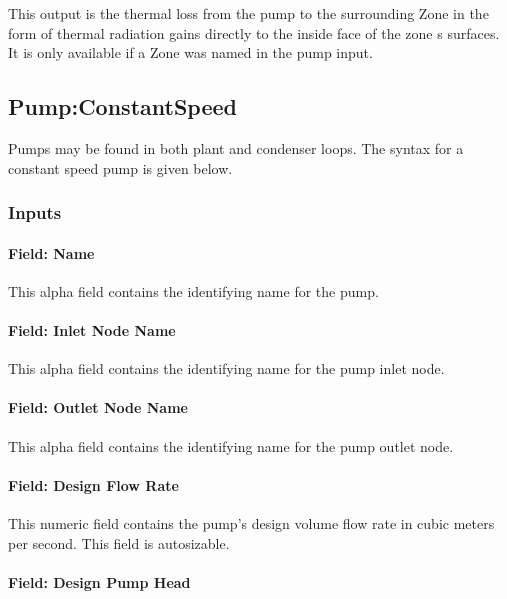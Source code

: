 This output is the thermal loss from the pump to the surrounding Zone in the form of thermal radiation gains directly to the inside face of the zone s surfaces. It is only available if a Zone was named in the pump input.

\subsection{Pump:ConstantSpeed}\label{pumpconstantspeed}

Pumps may be found in both plant and condenser loops. The syntax for a constant speed pump is given below.

\subsubsection{Inputs}\label{inputs-1-034}

\paragraph{Field: Name}\label{field-name-1-033}

This alpha field contains the identifying name for the pump.

\paragraph{Field: Inlet Node Name}\label{field-inlet-node-name-1-002}

This alpha field contains the identifying name for the pump inlet node.

\paragraph{Field: Outlet Node Name}\label{field-outlet-node-name-1-003}

This alpha field contains the identifying name for the pump outlet node.

\paragraph{Field: Design Flow Rate}\label{field-design-flow-rate-002}

This numeric field contains the pump's design volume flow rate in cubic meters per second. This field is autosizable.

\paragraph{Field: Design Pump Head}\label{field-design-pump-head-1}

